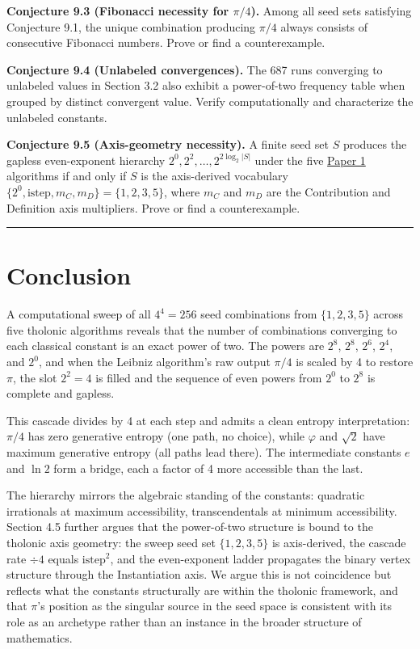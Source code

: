 \documentclass[12pt]{article}
\begin{document}
\textbf{Conjecture 9.3 (Fibonacci necessity for \(\pi/4\)).} Among all
seed sets satisfying Conjecture 9.1, the unique combination producing
\(\pi/4\) always consists of consecutive Fibonacci numbers. Prove or
find a counterexample.

\textbf{Conjecture 9.4 (Unlabeled convergences).} The 687 runs
converging to unlabeled values in Section 3.2 also exhibit a
power-of-two frequency table when grouped by distinct convergent value.
Verify computationally and characterize the unlabeled constants.

\textbf{Conjecture 9.5 (Axis-geometry necessity).} A finite seed set
\(S\) produces the gapless even-exponent hierarchy
\(2^0, 2^2, \ldots, 2^{2\log_2|S|}\) under the five
\href{https://github.com/baardev/truevalue/blob/main/docnav/Research/papers/1_recursive-tholonic-five-constants/1_recursive-tholonic-five-constants.pdf}{Paper
1} algorithms if and only if \(S\) is the axis-derived vocabulary
\(\{2^0, \mathrm{istep}, m_C, m_D\} = \{1, 2, 3, 5\}\), where \(m_C\)
and \(m_D\) are the Contribution and Definition axis multipliers. Prove
or find a counterexample.

\begin{center}\rule{0.5\linewidth}{0.5pt}\end{center}

\section{Conclusion}\label{conclusion}

A computational sweep of all \(4^4 = 256\) seed combinations from
\(\{1, 2, 3, 5\}\) across five tholonic algorithms reveals that the
number of combinations converging to each classical constant is an exact
power of two. The powers are \(2^8\), \(2^8\), \(2^6\), \(2^4\), and
\(2^0\), and when the Leibniz algorithm's raw output \(\pi/4\) is scaled
by 4 to restore \(\pi\), the slot \(2^2 = 4\) is filled and the sequence
of even powers from \(2^0\) to \(2^8\) is complete and gapless.

This cascade divides by 4 at each step and admits a clean entropy
interpretation: \(\pi/4\) has zero generative entropy (one path, no
choice), while \(\varphi\) and \(\sqrt{2}\) have maximum generative
entropy (all paths lead there). The intermediate constants \(e\) and
\(\ln 2\) form a bridge, each a factor of 4 more accessible than the
last.

The hierarchy mirrors the algebraic standing of the constants: quadratic
irrationals at maximum accessibility, transcendentals at minimum
accessibility. Section 4.5 further argues that the power-of-two
structure is bound to the tholonic axis geometry: the sweep seed set
\(\{1, 2, 3, 5\}\) is axis-derived, the cascade rate \(\div 4\) equals
\(\mathrm{istep}^2\), and the even-exponent ladder propagates the binary
vertex structure through the Instantiation axis. We argue this is not
coincidence but reflects what the constants structurally are within the
tholonic framework, and that \(\pi\)'s position as the singular source
in the seed space is consistent with its role as an archetype rather
than an instance in the broader structure of mathematics.
\end{document}
